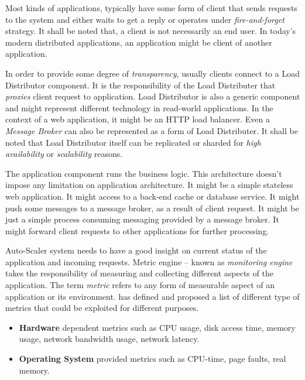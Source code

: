 \begin{description}[leftmargin=0pt]
    \item[Clients] Most kinds of applications, typically have some form of client that sends requests to the system and either waits to get a reply or operates under \emph{fire-and-forget} strategy. It shall be noted that, a client is not necessarily an end user. In today's modern distributed applications, an application might be client of another application.
    \item[Load Distributor] In order to provide some degree of \emph{transparency}, usually clients connect to a Load Distributor component. It is the responsibility of the Load Distributer that \emph{proxies} client request to application. Load Distributor is also a generic component and might represent different technology in read-world applications. In the context of a web application, it might be an HTTP load balancer. Even a \emph{Message Broker} can also be represented as a form of Load Distributer. It shall be noted that Load Distributor itself can be replicated or sharded for \emph{high availability} or \emph{scalability} reasons.
    \item[Application] The application component runs the business logic. This architecture doesn't impose any limitation on application architecture. It might be a simple stateless web application. It might access to a back-end cache or database service. It might push some messages to a message broker, as a result of client request. It might be just a simple process consuming messaging provided by a message broker. It might forward client requests to other applications for further processing.
    \item[Metric Engine] Auto-Scaler system needs to have a good insight on current status of the application and incoming requests. Metric engine -- known as \emph{monitoring engine} takes the responsibility of measuring and collecting different aspects of the application. The term \emph{metric} refers to any form of measurable aspect of an application or its environment. \textcite{Ghanbari:2011} has defined and proposed a list of different type of metrics that could be exploited for different purposes.
    \begin{itemize}
        \item \textbf{Hardware} dependent metrics such as CPU usage, disk access time, memory usage, network bandwidth usage, network latency.
        \item \textbf{Operating System} provided metrics such as CPU-time, page faults, real memory.

\end{itemize}
\end{description}
